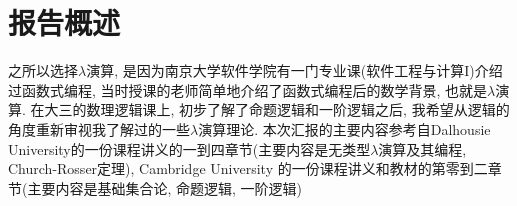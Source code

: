 \newpage
\section{报告概述}
之所以选择$\lambda$演算, 是因为南京大学软件学院有一门专业课(软件工程与计算I)介绍过函数式编程, 当时授课的老师简单地介绍了函数式编程后的数学背景, 也就是$\lambda$演算. 在大三的数理逻辑课上, 初步了解了命题逻辑和一阶逻辑之后, 我希望从逻辑的角度重新审视我了解过的一些$\lambda$演算理论. 
本次汇报的主要内容参考自Dalhousie University的一份课程讲义\cite{selingerLectureNotesLambda}的一到四章节(主要内容是无类型$\lambda$演算及其编程, Church-Rosser定理), Cambridge University 的一份课程讲义\cite{henkbarendregtLAMBDACALCULUSTYPES}和教材\cite{herbertMathematicalIntroductionLogic}的第零到二章节(主要内容是基础集合论, 命题逻辑, 一阶逻辑)